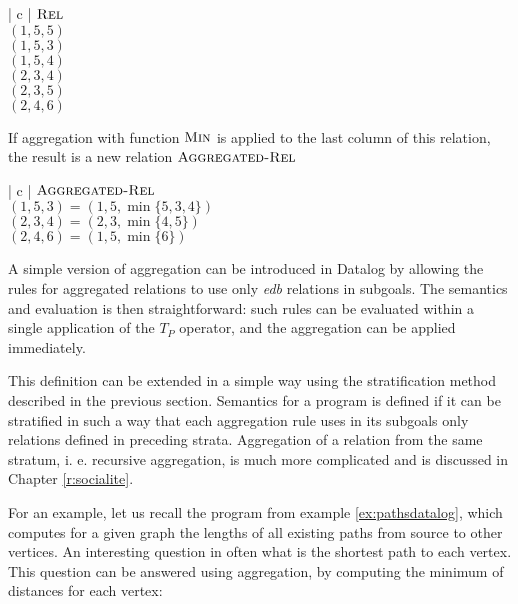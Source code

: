 \begin{centab}{ | c | }
  \hline
  $\textsc{Rel}$ \\
  \hline
  $(1, 5, 5)$ \\
  $(1, 5, 3)$ \\
  $(1, 5, 4)$ \\
  $(2, 3, 4)$ \\
  $(2, 3, 5)$ \\
  $(2, 4, 6)$ \\
  \hline
\end{centab}

If aggregation with function $\textsc{Min}$ is applied to the last column of this relation, the result is a new relation $\textsc{Aggregated-Rel}$

\begin{centab}{ | c | }
  \hline
  $\textsc{Aggregated-Rel}$ \\
  \hline
  $(1, 5, 3) = (1, 5, \min{\{5, 3, 4\}})$ \\
  $(2, 3, 4) = (2, 3, \min{\{4, 5\}})$ \\
  $(2, 4, 6) = (1, 5, \min{\{6\}})$ \\
  \hline
\end{centab}

A simple version of aggregation can be introduced in Datalog by allowing the rules for aggregated relations to use only \emph{edb} relations in subgoals. The semantics and evaluation is then straightforward: such rules can be evaluated within a single application of the $T_P$ operator, and the aggregation can be applied immediately.

This definition can be extended in a simple way using the stratification method described in the previous section. Semantics for a program is defined if it can be stratified in such a way that each aggregation rule uses in its subgoals only relations defined in preceding strata. Aggregation of a relation from the same stratum, i. e. recursive aggregation, is much more complicated and is discussed in Chapter \ref{r:socialite}.

For an example, let us recall the program from example \ref{ex:pathsdatalog}, which computes for a given graph the lengths of all existing paths from source to other vertices. An interesting question in often what is the shortest path to each vertex. This question can be answered using aggregation, by computing the minimum of distances for each vertex: 


